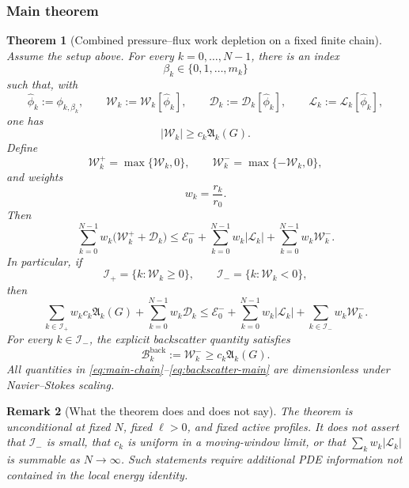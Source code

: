 \documentclass[10pt,a4paper]{amsart}
\numberwithin{equation}{section}
\newtheorem{theorem}{Theorem}[section]
\newtheorem{remark}[theorem]{Remark}
\newcommand{\W}{\mathcal W}
\newcommand{\D}{\mathcal D}
\newcommand{\Lk}{\mathcal L}
\newcommand{\Ek}{\mathcal E}
\newcommand{\Aact}{\mathfrak A}
\newcommand{\Bback}{\mathcal B}
\begin{document}
\subsubsection{Main theorem}


\begin{theorem}[Combined pressure--flux work depletion on a fixed finite chain]\label{thm:main}
Assume the setup above. For every \(k=0,\ldots,N-1\), there is an index
\[
\beta_k\in\{0,1,\ldots,m_k\}
\]
such that, with
\begin{equation}\label{eq:selected}
\widehat\phi_k:=\phi_{k,\beta_k},
\qquad
\W_k:=\W_k[\widehat\phi_k],
\qquad
\D_k:=\D_k[\widehat\phi_k],
\qquad
\Lk_k:=\Lk_k[\widehat\phi_k],
\end{equation}
one has
\begin{equation}\label{eq:extraction-main}
|\W_k|\ge c_k\Aact_k(G).
\end{equation}
Define
\begin{equation}\label{eq:Wpm}
\W_k^+=\max\{\W_k,0\},
\qquad
\W_k^-=\max\{-\W_k,0\},
\end{equation}
and weights
\begin{equation}\label{eq:wk}
w_k=\frac{r_k}{r_0}.
\end{equation}
Then
\begin{equation}\label{eq:main-chain}
\boxed{
\sum_{k=0}^{N-1}w_k\bigl(\W_k^++\D_k\bigr)
\le
\Ek_0^-
+
\sum_{k=0}^{N-1}w_k|\Lk_k|
+
\sum_{k=0}^{N-1}w_k\W_k^-.
}
\end{equation}
In particular, if
\begin{equation}\label{eq:F-B-sets}
\mathcal I_+
=\{k:\W_k\ge0\},
\qquad
\mathcal I_-
=\{k:\W_k<0\},
\end{equation}
then
\begin{equation}\label{eq:main-active}
\boxed{
\sum_{k\in\mathcal I_+}w_kc_k\Aact_k(G)
+
\sum_{k=0}^{N-1}w_k\D_k
\le
\Ek_0^-
+
\sum_{k=0}^{N-1}w_k|\Lk_k|
+
\sum_{k\in\mathcal I_-}w_k\W_k^-.
}
\end{equation}
For every \(k\in\mathcal I_-\), the explicit backscatter quantity satisfies
\begin{equation}\label{eq:backscatter-main}
\Bback_k^{\mathrm{back}}
:=\W_k^-
\ge c_k\Aact_k(G).
\end{equation}
All quantities in \eqref{eq:main-chain}--\eqref{eq:backscatter-main} are dimensionless under Navier--Stokes scaling.
\end{theorem}


\begin{remark}[What the theorem does and does not say]\label{rem:scope}
The theorem is unconditional at fixed \(N\), fixed \(\ell>0\), and fixed active profiles. It does not assert that \(\mathcal I_-\) is small, that \(c_k\) is uniform in a moving-window limit, or that \(\sum_k w_k|\Lk_k|\) is summable as \(N\to\infty\). Such statements require additional PDE information not contained in the local energy identity.
\end{remark}
\end{document}
